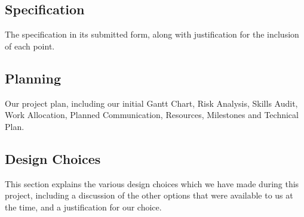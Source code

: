 \subsection{Specification}
The specification in its submitted form, along with justification for the 
inclusion of each point.

\subsection{Planning}
Our project plan, including our initial Gantt Chart, Risk Analysis, Skills 
Audit, Work Allocation, Planned Communication, Resources, Milestones and 
Technical Plan.

\subsection{Design Choices}
This section explains the various design choices which we have made during 
this project, including a discussion of the other options that were available 
to us at the time, and a justification for our choice.



